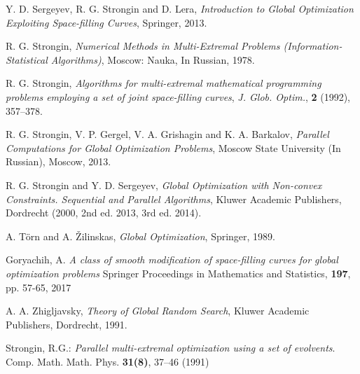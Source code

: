 \documentclass[runningheads]{llncs}
\begin{document}
%
%
% 
% 
%
\begin{thebibliography}{107}

\newblock Y. D. Sergeyev, R. G. Strongin and D. Lera,
\newblock \emph{Introduction to Global Optimization Exploiting Space-filling Curves},
\newblock Springer, 2013.

\newblock R. G. Strongin,
\newblock \emph{Numerical Methods in Multi-Extremal Problems (Information-Statistical Algorithms)},
\newblock Moscow: Nauka, In Russian, 1978.

\newblock R. G. Strongin,
\newblock \emph{\emph{Algorithms for multi-extremal mathematical programming problems
employing a set of joint space-filling curves}},
\newblock \emph{J. Glob. Optim.}, \textbf{2} (1992), 357--378.

\newblock R. G. Strongin, V. P. Gergel, V. A. Grishagin and K. A. Barkalov,
\newblock \emph{Parallel Computations for Global Optimization Problems},
\newblock Moscow State University (In Russian), Moscow, 2013.

\newblock R. G. Strongin and Y. D. Sergeyev,
\newblock \emph{Global Optimization with Non-convex Constraints. Sequential and Parallel
Algorithms},
\newblock Kluwer Academic Publishers, Dordrecht (2000, 2nd ed. 2013, 3rd ed. 2014).

\newblock A. T\"orn and A. \v Zilinskas,
\newblock \emph{Global Optimization},
\newblock Springer, 1989.

\newblock Goryachih, A.
\newblock \emph{A class of smooth modification of space-filling curves for global optimization
problems}
\newblock Springer Proceedings in Mathematics and Statistics, \textbf{197}, pp. 57-65, 2017

\newblock A. A. Zhigljavsky,
\newblock \emph{Theory of Global Random Search},
\newblock Kluwer Academic Publishers, Dordrecht, 1991.

Strongin, R.G.: \emph{Parallel multi-extremal optimization using a set of evolvents}. Comp. Math.
Math. Phys. \textbf{31(8)}, 37--46 (1991)


\end{thebibliography}
\end{document}
